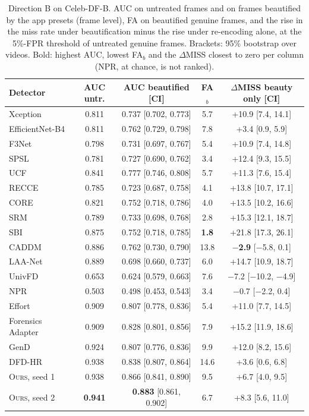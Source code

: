 \documentclass[conference]{IEEEtran}
\newcommand{\ours}{\textsc{Ours}}
\begin{document}
\begin{table}[t]
\centering
\caption{Direction B on Celeb-DF-B. AUC on untreated frames and on frames beautified by the app presets (frame level), FA on
beautified genuine frames, and the rise in the miss rate under beautification minus the rise under re-encoding alone, at the
5\%-FPR threshold of untreated genuine frames. Brackets: 95\% bootstrap over videos. Bold: highest AUC, lowest FA$_b$ and the $\Delta$MISS closest to zero per column (NPR, at chance, is not ranked).}
\label{tab:dirB}
\scriptsize
\setlength{\tabcolsep}{2.5pt}
\begin{tabular}{@{}l c c c c@{}}
\toprule
Detector & AUC untr. & AUC beautified [CI] & FA$_b$ & $\Delta$MISS beauty only [CI] \\
\midrule
Xception & 0.811 & 0.737 [0.702, 0.773] & 5.7 & +10.9 [7.4, 14.1] \\
EfficientNet-B4 & 0.811 & 0.762 [0.729, 0.798] & 7.8 & +3.4 [0.9, 5.9] \\
F3Net & 0.798 & 0.731 [0.697, 0.767] & 5.4 & +10.9 [7.4, 14.8] \\
SPSL & 0.781 & 0.727 [0.690, 0.762] & 3.4 & +12.4 [9.3, 15.5] \\
UCF & 0.841 & 0.777 [0.746, 0.808] & 5.7 & +11.3 [7.6, 15.4] \\
RECCE & 0.785 & 0.723 [0.687, 0.758] & 4.1 & +13.8 [10.7, 17.1] \\
CORE & 0.821 & 0.752 [0.718, 0.786] & 4.0 & +13.5 [10.2, 16.6] \\
SRM & 0.789 & 0.733 [0.698, 0.768] & 2.8 & +15.3 [12.1, 18.7] \\
SBI & 0.875 & 0.752 [0.718, 0.785] & \textbf{1.8} & +21.8 [17.3, 26.1] \\
CADDM & 0.886 & 0.762 [0.730, 0.790] & 13.8 & \textbf{$-$2.9} [$-$5.8, 0.1] \\
LAA-Net & 0.889 & 0.698 [0.660, 0.737] & 6.0 & +14.7 [10.9, 18.7] \\
UnivFD & 0.653 & 0.624 [0.579, 0.663] & 7.6 & $-$7.2 [$-$10.2, $-$4.9] \\
NPR & 0.503 & 0.498 [0.453, 0.543] & 3.4 & $-$0.7 [$-$2.2, 0.4] \\
Effort & 0.909 & 0.807 [0.778, 0.836] & 5.4 & +11.0 [7.7, 14.5] \\
Forensics Adapter & 0.909 & 0.828 [0.801, 0.856] & 7.9 & +15.2 [11.9, 18.6] \\
GenD & 0.924 & 0.807 [0.776, 0.836] & 9.9 & +12.0 [8.2, 15.6] \\
DFD-HR & 0.938 & 0.838 [0.807, 0.864] & 14.6 & +3.6 [0.6, 6.8] \\
\midrule
\ours{}, seed 1 & 0.938 & 0.866 [0.841, 0.890] & 9.5 & +6.7 [4.0, 9.5] \\
\ours{}, seed 2 & \textbf{0.941} & \textbf{0.883} [0.861, 0.902] & 6.7 & +8.3 [5.6, 11.0] \\
\bottomrule
\end{tabular}
\end{table}
\end{document}

